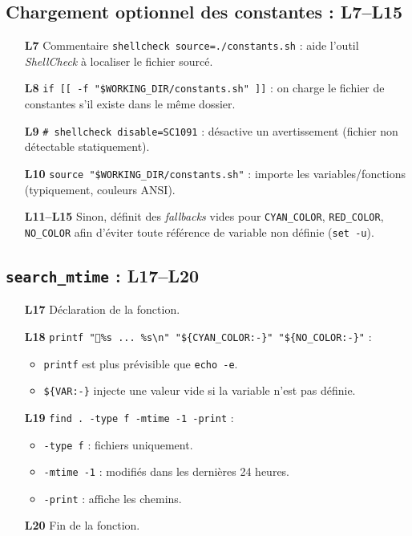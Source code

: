 \documentclass[11pt,a4paper]{article}
\begin{document}
\subsection*{Chargement optionnel des constantes : L7--L15}
\begin{enumerate}
  \item[\textbf{L7}] Commentaire \texttt{shellcheck source=./constants.sh} : aide l'outil \emph{ShellCheck} à localiser le fichier sourcé.
  \item[\textbf{L8}] \texttt{if [[ -f "\$WORKING\_DIR/constants.sh" ]]} : on charge le fichier de constantes s'il existe dans le même dossier.
  \item[\textbf{L9}] \texttt{\# shellcheck disable=SC1091} : désactive un avertissement (fichier non détectable statiquement).
  \item[\textbf{L10}] \texttt{source "\$WORKING\_DIR/constants.sh"} : importe les variables/fonctions (typiquement, couleurs ANSI).
  \item[\textbf{L11--L15}] Sinon, définit des \emph{fallbacks} vides pour \texttt{CYAN\_COLOR}, \texttt{RED\_COLOR}, \texttt{NO\_COLOR} afin d'éviter toute référence de variable non définie (\texttt{set -u}).
\end{enumerate}

\subsection*{\texttt{search\_mtime} : L17--L20}
\begin{enumerate}
  \item[\textbf{L17}] Déclaration de la fonction.
  \item[\textbf{L18}] \texttt{printf "🚀\%s ... \%s\textbackslash n" "\$\{CYAN\_COLOR:-\}" "\$\{NO\_COLOR:-\}"} :
  \begin{itemize}
    \item \texttt{printf} est plus prévisible que \texttt{echo -e}.
    \item \texttt{\$\{VAR:-\}} injecte une valeur vide si la variable n'est pas définie.
  \end{itemize}
  \item[\textbf{L19}] \texttt{find . -type f -mtime -1 -print} :
  \begin{itemize}
    \item \texttt{-type f} : fichiers uniquement.
    \item \texttt{-mtime -1} : modifiés dans les dernières 24 heures.
    \item \texttt{-print} : affiche les chemins.
  \end{itemize}
  \item[\textbf{L20}] Fin de la fonction.
\end{enumerate}
\end{document}
